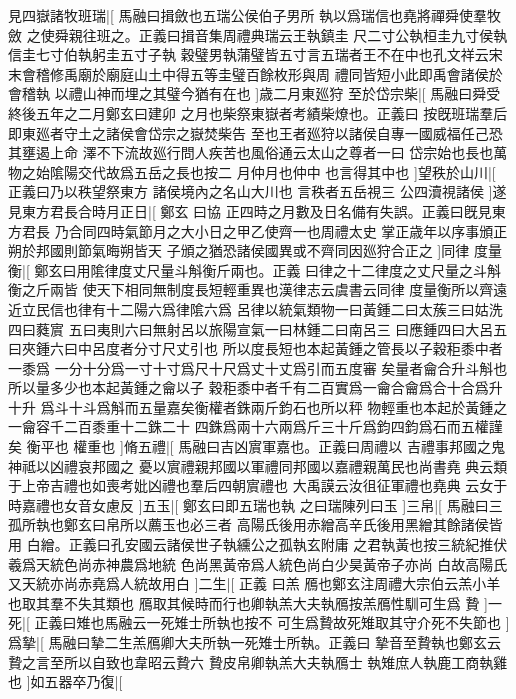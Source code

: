 %
見四嶽諸牧班瑞|[%
馬融曰揖斂也五瑞公侯伯子男所%
執以爲瑞信也堯將禪舜使羣牧斂%
%
之使舜親往班之。正義曰揖音集周禮典瑞云王執鎮圭%
尺二寸公執桓圭九寸侯執信圭七寸伯執躬圭五寸子執%
%
穀璧男執蒲璧皆五寸言五瑞者王不在中也孔文祥云宋%
末會稽修禹廟於廟庭山土中得五等圭璧百餘枚形與周%
%
禮同皆短小此即禹會諸侯於會稽執%
以禮山神而埋之其璧今猶有在也%
]歳二月東廵狩%
%
至於岱宗柴|[%
馬融曰舜受終後五年之二月鄭玄曰建卯%
之月也柴祭東嶽者考績柴燎也。正義曰%
%
按旣班瑞羣后即東廵者守土之諸侯會岱宗之嶽焚柴告%
至也王者廵狩以諸侯自專一國威福任己恐其壅遏上命%
%
澤不下流故廵行問人疾苦也風俗通云太山之尊者一曰%
岱宗始也長也萬物之始隂陽交代故爲五岳之長也按二%
%
月仲月也仲中%
也言得其中也%
]望秩於山川|[%
正義曰乃以秩望祭東方%
諸侯境內之名山大川也%
%
言秩者五岳視三%
公四瀆視諸侯%
]遂見東方君長合時月正日|[%
鄭玄%
曰協%
%
正四時之月數及日名備有失誤。正義曰旣見東方君長%
乃合同四時氣節月之大小日之甲乙使齊一也周禮太史%
%
掌正歳年以序事頒正朔於邦國則節氣晦朔皆天%
子頒之猶恐諸侯國異或不齊同因廵狩合正之%
]同律%
%
度量衡|[%
鄭玄曰用隂律度丈尺量斗斛衡斤兩也。正義%
曰律之十二律度之丈尺量之斗斛衡之斤兩皆%
%
使天下相同無制度長短輕重異也漢律志云虞書云同律%
度量衡所以齊遠近立民信也律有十二陽六爲律隂六爲%
%
呂律以統氣類物一曰黃鍾二曰太蔟三曰姑洗四曰蕤賔%
五曰夷則六曰無射呂以旅陽宣氣一曰林鍾二曰南呂三%
%
曰應鍾四曰大呂五曰夾鍾六曰中呂度者分寸尺丈引也%
所以度長短也本起黃鍾之管長以子穀秬黍中者一黍爲%
%
一分十分爲一寸十寸爲尺十尺爲丈十丈爲引而五度審%
矣量者龠合升斗斛也所以量多少也本起黃鍾之龠以子%
%
穀秬黍中者千有二百實爲一龠合龠爲合十合爲升十升%
爲斗十斗爲斛而五量嘉矣衡權者銖兩斤鈞石也所以秤%
%
物輕重也本起於黃鍾之一龠容千二百黍重十二銖二十%
四銖爲兩十六兩爲斤三十斤爲鈞四鈞爲石而五權謹矣%
%
衡平也%
權重也%
]脩五禮|[%
馬融曰吉凶賔軍嘉也。正義曰周禮以%
吉禮事邦國之鬼神祗以凶禮哀邦國之%
%
憂以賔禮親邦國以軍禮同邦國以嘉禮親萬民也尚書堯%
典云類于上帝吉禮也如喪考妣凶禮也羣后四朝賔禮也%
%
大禹謨云汝徂征軍禮也堯典%
云女于時嘉禮也女音女慮反%
]五玉|[%
鄭玄曰即五瑞也執%
之曰瑞陳列曰玉%
%
]三帛|[%
馬融曰三孤所執也鄭玄曰帛所以薦玉也必三者%
高陽氏後用赤繒高辛氏後用黑繒其餘諸侯皆用%
%
白繒。正義曰孔安國云諸侯世子執纁公之孤執玄附庸%
之君執黃也按三統紀推伏羲爲天統色尚赤神農爲地統%
%
色尚黑黃帝爲人統色尚白少昊黃帝子亦尚%
白故高陽氏又天統亦尚赤堯爲人統故用白%
]二生|[%
正義%
曰羔%
%
鴈也鄭玄注周禮大宗伯云羔小羊也取其羣不失其類也%
鴈取其候時而行也卿執羔大夫執鴈按羔鴈性馴可生爲%
%
贄%
]一死|[%
正義曰雉也馬融云一死雉士所執也按不%
可生爲贄故死雉取其守介死不失節也%
]爲摯|[%
%
馬融曰摯二生羔鴈卿大夫所執一死雉士所執。正義曰%
摯音至贄執也鄭玄云贄之言至所以自致也韋昭云贄六%
%
贄皮帛卿執羔大夫執鴈士%
執雉庶人執鹿工商執雞也%
]如五器卒乃復|[%
